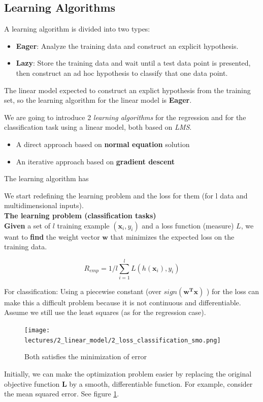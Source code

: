 \documentclass[../main.tex]{subfiles}
\begin{document}
\newpage
\subsection{Learning Algorithms}
A learning algorithm is divided into two types:
\begin{itemize}
    \item \textbf{Eager}: Analyze the training data and construct an explicit hypothesis.
    \item \textbf{Lazy}: Store the training data and wait until a test data point is presented, then construct an ad hoc hypothesis to classify that one data point.
\end{itemize}
The linear model expected to construct an explict hypothesis from the training set, so the learning algorithm for the linear model is \textbf{Eager}.

We are going to introduce 2 \emph{learning algorithms} for the regression and for the classification task using a linear model, both based on \emph{LMS}.
\begin{itemize}
    \item A direct approach based on \textbf{normal equation} solution
    \item An iterative approach based on \textbf{gradient descent}
\end{itemize}
The learning algorithm has 


We start redefining the learning problem and the loss for them (for l data and multidimensional inputs).\\
\newline
\textbf{The learning problem (classification tasks)}\\
\textbf{Given} a set of $l$ training example $( \mathbf{x}_i, y_i)$ and a loss function (measure) $L$, we want to \textbf{find} the weight vector $\textbf{w}$ that minimizes the expected loss on the training data.

$$ R_{emp} = 1/l\sum_{i = 1}^{l} L(h(\mathbf{x}_i),y_i) $$

For classification: Using a piecewise constant (over $sign(\mathbf{w^Tx})$ ) for the loss can make this a difficult problem because it is not continuous and differentiable. Assume we still use the least squares (as for the regression case).\\

\begin{figure}[H]
    \centering
    \texttt{[image: lectures/2\_linear\_model/2\_loss\_classification\_smo.png]}
    \caption{Both satisfies the minimization of error}
    \label{fig:2_loss_classification_smo}
\end{figure}
Initially, we can make the optimization problem easier by replacing the original objective function \textbf{L} by a smooth, differentiable function. For example, consider the mean squared error. See figure \ref{fig:2_loss_classification_smo}.\\
\end{document}

